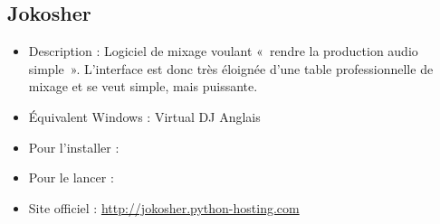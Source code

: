 \subsection{Jokosher}
\begin{itemize}
\begingroup
{}
\item Description : Logiciel de mixage voulant «~rendre la production audio simple~». L'interface est donc très éloignée d'une table professionnelle de mixage et se veut simple, mais puissante.{\par}
\item Équivalent Windows : Virtual DJ Anglais{\par}
\endgroup
\item Pour l'installer : 
\item Pour le lancer : 
\item Site officiel : \url{http://jokosher.python-hosting.com}{\par}
\end{itemize}

